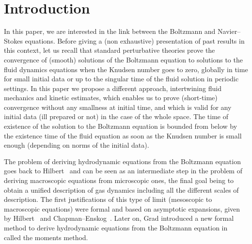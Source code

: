 \section{Introduction}
In this paper, we are interested in the link between the Boltzmann and Navier--Stokes equations. Before giving a (non exhaustive) presentation of past results in this context, let us recall that standard perturbative theories prove the convergence of (smooth) solutions of the Boltzmann equation to solutions to the fluid dynamics equations when the Knudsen number goes to zero, globally in time for small initial data or up to the singular time of the fluid solution in periodic settings. In this paper we propose a different approach, intertwining fluid mechanics and kinetic estimates, which enables us to prove (short-time) convergence without any smallness at initial time, and which is valid for any initial data (ill prepared or not) in the case of the whole space. The time of existence of the solution to the Boltzmann equation is bounded from below by the existence time of the fluid equation as soon as the Knudsen number is small enough (depending on norms of the initial data).



The problem of deriving hydrodynamic equations from the Boltzmann equation goes back to Hilbert~\cite{Hilbert} and can be seen as an intermediate step in the problem of deriving macroscopic equations from microscopic ones, the final goal being to obtain a unified description of gas dynamics including all the different scales of description. The first justifications of this type of limit (mesoscopic to macroscopic equations) were formal and based on asymptotic expansions, given by Hilbert~\cite{Hilbert} and Chapman--Enskog~\cite{ChapEns}. Later on, Grad introduced a new formal method to derive hydrodynamic equations from the Boltzmann equation in~\cite{Gradhydro} called the moments method.

